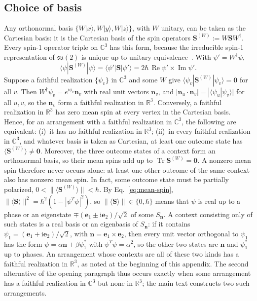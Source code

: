 \documentclass[twocolumn,aps,pra,floatfix,amsmath,amssymb,longbibliography]{revtex4-2}
\newcommand{\ii}{\mathrm{i}}
\newcommand{\C}{\mathbb{C}}
\newcommand{\R}{\mathbb{R}}
\begin{document}
\subsection{Choice of basis}
Any orthonormal basis $\{W|x\rangle,W|y\rangle,W|z\rangle\}$, with $W$ unitary, can be taken as the Cartesian basis: it is the Cartesian basis of the spin operators $\mathbf S^{(W)}:=W\mathbf SW^\dagger$.  Every spin-1 operator triple on $\C^3$ has this form, because the irreducible spin-1 representation of $\mathfrak{su}(2)$ is unique up to unitary equivalence~\cite{Sakurai-1994,hall-2015}.  With $\psi'=W^\dagger\psi$,
\begin{equation}
 \langle\psi|\mathbf S^{(W)}|\psi\rangle
 =\langle\psi'|\mathbf S|\psi'\rangle
 =2\hbar\,\operatorname{Re}\psi'\times\operatorname{Im}\psi'.
 \label{eq:SW-mean}
\end{equation}
Suppose a faithful realization $\{\psi_v\}$ in $\C^3$ and some $W$ give $\langle\psi_v|\mathbf S^{(W)}|\psi_v\rangle=\mathbf 0$ for all $v$.  Then $W^\dagger\psi_v=e^{\ii\phi_v}\mathbf n_v$ with real unit vectors $\mathbf n_v$, and $|\mathbf n_u\cdot\mathbf n_v|=|\langle\psi_u|\psi_v\rangle|$ for all $u,v$, so the $\mathbf n_v$ form a faithful realization in $\R^3$.  Conversely, a faithful realization in $\R^3$ has zero mean spin at every vertex in the Cartesian basis.  Hence, for an arrangement with a faithful realization in $\C^3$, the following are equivalent: (i)~it has no faithful realization in $\R^3$; (ii)~in every faithful realization in $\C^3$, and whatever basis is taken as Cartesian, at least one outcome state has $\langle\mathbf S^{(W)}\rangle\neq\mathbf 0$.  Moreover, the three outcome states of a context form an orthonormal basis, so their mean spins add up to $\operatorname{Tr}\mathbf S^{(W)}=\mathbf 0$.  A nonzero mean spin therefore never occurs alone: at least one other outcome of the same context also has nonzero mean spin.  In fact, some outcome state must be partially polarized, $0<\|\langle\mathbf S^{(W)}\rangle\|<\hbar$.  By Eq.~\eqref{eq:mean-spin}, $\|\langle\mathbf S\rangle\|^2=\hbar^2(1-|\psi^T\psi|^2)$, so $\|\langle\mathbf S\rangle\|\in\{0,\hbar\}$ means that $\psi$ is real up to a phase or an eigenstate $\mp(\mathbf e_1\pm\ii\mathbf e_2)/\sqrt2$ of some $S_{\mathbf n}$.  A context consisting only of such states is a real basis or an eigenbasis of $S_{\mathbf n}$: if it contains $\psi_1=(\mathbf e_1+\ii\mathbf e_2)/\sqrt2$, with $\mathbf n=\mathbf e_1\times\mathbf e_2$, then every unit vector orthogonal to $\psi_1$ has the form $\psi=\alpha\mathbf n+\beta\psi_1^*$ with $\psi^T\psi=\alpha^2$, so the other two states are $\mathbf n$ and $\psi_1^*$ up to phases.  An arrangement whose contexts are all of these two kinds has a faithful realization in $\R^3$, as noted at the beginning of this appendix.  The second alternative of the opening paragraph thus occurs exactly when some arrangement has a faithful realization in $\C^3$ but none in $\R^3$; the main text constructs two such arrangements.


\end{document}
